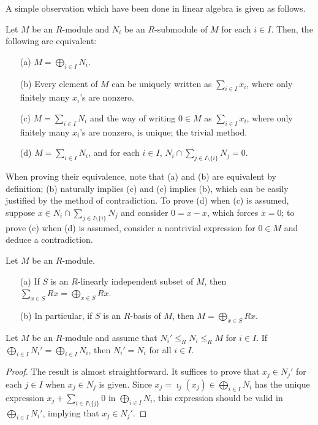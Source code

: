 A simple observation which have been done in linear algebra is given as follows.
\begin{obs}
    Let $M$ be an $R$-module and $N_i$ be an $R$-submodule of $M$ for each $i\in I$.
    Then, the following are equivalent:
    \begin{enumerate}
        \item[(a)]
        {
            $M=\bigoplus_{i\in I} N_i$.
        }
        \item[(b)]
        {
            Every element of $M$ can be uniquely written as $\sum_{i\in I} x_i$, where only finitely many $x_i$'s are nonzero.
        }
        \item[(c)]
        {
            $M=\sum_{i\in I}N_i$ and the way of writing $0\in M$ as $\sum_{i\in I} x_i$, where only finitely many $x_i$'s are nonzero, is unique; the trivial method.
        }
        \item[(d)]
        {
            $M=\sum_{i\in I}N_i$, and for each $i\in I$, $N_i\cap\sum_{j\in I\setminus\{i\}}N_j=0$.
        }
    \end{enumerate}
    When proving their equivalence, note that (a) and (b) are equivalent by definition; (b) naturally implies (c) and (c) implies (b), which can be easily justified by the method of contradiction.
    To prove (d) when (c) is assumed, suppose $x\in N_i\cap\sum_{j\in I\setminus\{i\}}N_j$ and consider $0=x-x$, which forces $x=0$; to prove (c) when (d) is assumed, consider a nontrivial expression for $0\in M$ and deduce a contradiction.
\end{obs}

\begin{obs}
    Let $M$ be an $R$-module.
    \begin{enumerate}
        \item[(a)]
        {
            If $S$ is an $R$-linearly independent subset of $M$, then $\sum_{x\in S} Rx=\bigoplus_{x\in S} Rx$.
        }
        \item[(b)]
        {
            In particular, if $S$ is an $R$-basis of $M$, then $M=\bigoplus_{x\in S} Rx$.
        }
    \end{enumerate}
\end{obs}

\begin{prop}
    Let $M$ be an $R$-module and assume that $N_i'\leq_R N_i\leq_R M$ for $i\in I$.
    If $\bigoplus_{i\in I} N_i'=\bigoplus_{i\in I} N_i$, then $N_i'=N_i$ for all $i\in I$.
\end{prop}
\begin{proof}
    The result is almost straightforward.
    It suffices to prove that $x_j\in N_j'$ for each $j\in I$ when $x_j\in N_j$ is given.
    Since $x_j=\imath_j(x_j)\in\bigoplus_{i\in I} N_i$ has the unique expression $x_j+\sum_{i\in I\setminus\{j\}}0$ in $\bigoplus_{i\in I}N_i$, this expression should be valid in $\bigoplus_{i\in I}N_i'$, implying that $x_j\in N_j'$.
\end{proof}

